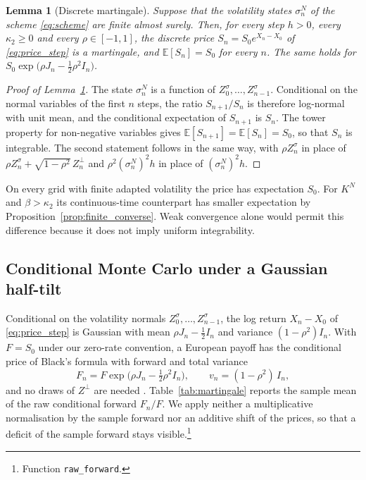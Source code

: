 \documentclass{rQUF2e}
\theoremstyle{plain}
\newtheorem{lemma}[theorem]{Lemma}
\theoremstyle{definition}
\theoremstyle{remark}
\newcommand{\E}{\mathbb{E}}
\begin{document}
\begin{lemma}[Discrete martingale]\label{lem:discrete_martingale}
Suppose that the volatility states $\sigma^N_n$ of the scheme \eqref{eq:scheme} are finite almost surely. Then, for every step $h>0$, every $\kappa_2\ge0$ and every $\rho\in[-1,1]$, the discrete price $S_n=S_0e^{X_n-X_0}$ of \eqref{eq:price_step} is a martingale, and $\E[S_n]=S_0$ for every $n$. The same holds for $S_0\exp\big(\rho J_n-\tfrac12\rho^2I_n\big)$.
\end{lemma}

\begin{proof}[Proof of Lemma~\ref{lem:discrete_martingale}] The state $\sigma^N_n$ is a function of $Z^\sigma_0,\dots,Z^\sigma_{n-1}$. Conditional on the normal variables of the first $n$ steps, the ratio $S_{n+1}/S_n$ is therefore log-normal with unit mean, and the conditional expectation of $S_{n+1}$ is $S_n$. The tower property for non-negative variables gives $\E[S_{n+1}]=\E[S_n]=S_0$, so that $S_n$ is integrable. The second statement follows in the same way, with $\rho Z^\sigma_n$ in place of $\rho Z^\sigma_n+\sqrt{1-\rho^2}\,Z^\perp_n$ and $\rho^2(\sigma^N_n)^2h$ in place of $(\sigma^N_n)^2h$. \end{proof}

On every grid with finite adapted volatility the price has expectation $S_0$. For $K^N$ and $\beta>\kappa_2$ its continuous-time counterpart has smaller expectation by Proposition~\ref{prop:finite_converse}. Weak convergence alone would permit this difference because it does not imply uniform integrability.

\subsection{Conditional Monte Carlo under a Gaussian half-tilt}\label{sec:conditional_mc}

Conditional on the volatility normals $Z^\sigma_0,\dots,Z^\sigma_{n-1}$, the log return $X_n-X_0$ of \eqref{eq:price_step} is Gaussian with mean $\rho J_n-\tfrac12I_n$ and variance $(1-\rho^2)I_n$. With $F=S_0$ under our zero-rate convention, a European payoff has the conditional price of Black's formula with forward and total variance
\begin{equation}\label{eq:conditional_forward}
F_n=F\exp\big(\rho J_n-\tfrac12\rho^2I_n\big),\qquad v_n=(1-\rho^2)\,I_n,
\end{equation}
and no draws of $Z^\perp$ are needed \citep{Willard1997,RomanoTouzi1997}. Table~\ref{tab:martingale} reports the sample mean of the raw conditional forward $F_n/F$. We apply neither a multiplicative normalisation by the sample forward nor an additive shift of the prices, so that a deficit of the sample forward stays visible.\footnote{Function \texttt{raw\_forward}.}
\end{document}
